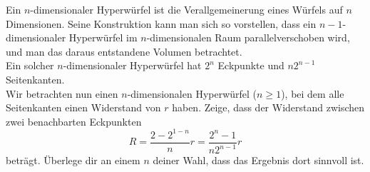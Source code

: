 \begin{Exercise}[label = hypercube, origin = {Max Marienhagen, Aaron Wild}, difficulty = 5, title =  Widerstandswürfel]
Ein $n$-dimensionaler Hyperwürfel ist die Verallgemeinerung eines Würfels auf $n$ Dimensionen. Seine Konstruktion kann man sich so vorstellen, dass ein $n-1$-dimensionaler Hyperwürfel im $n$-dimensionalen Raum parallelverschoben wird, und man das daraus entstandene Volumen betrachtet.\\
Ein solcher $n$-dimensionaler Hyperwürfel hat $2^n$ Eckpunkte und $n2^{n-1}$ Seitenkanten.\\
Wir betrachten nun einen $n$-dimensionalen Hyperwürfel ($n\geq 1$), bei dem alle Seitenkanten einen Widerstand von $r$ haben. Zeige, dass der Widerstand zwischen zwei benachbarten Eckpunkten 
\begin{equation}
	R = \frac{2-2^{1-n}}{n}r = \frac{2^n-1}{n2^{n-1}}r
\end{equation}
beträgt. Überlege dir an einem $n$ deiner Wahl, dass das Ergebnis dort sinnvoll ist.
\end{Exercise}
